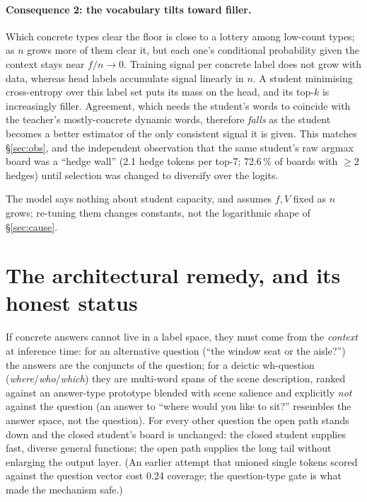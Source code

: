 \paragraph{Consequence 2: the vocabulary tilts toward filler.} Which concrete
types clear the floor is close to a lottery among low-count types; as $n$
grows more of them clear it, but each one's conditional probability given the
context stays near $f/n\to0$. Training signal per concrete label does not grow
with data, whereas head labels accumulate signal linearly in $n$. A student
minimising cross-entropy over this label set puts its mass on the head, and
its top-$k$ is increasingly filler. Agreement, which needs the student's words
to coincide with the teacher's mostly-concrete dynamic words, therefore
\emph{falls} as the student becomes a better estimator of the only consistent
signal it is given. This matches \S\ref{sec:obs}, and the independent
observation that the same student's raw argmax board was a ``hedge wall''
(2.1 hedge tokens per top-7; 72.6\,\% of boards with $\ge2$ hedges) until
selection was changed to diversify over the logits.

The model says nothing about student capacity, and assumes $f,V$ fixed as
$n$ grows; re-tuning them changes constants, not the logarithmic shape of
\S\ref{sec:cause}.

\section{The architectural remedy, and its honest status}
\label{sec:remedy}
If concrete answers cannot live in a label space, they must come from
the \emph{context} at inference time: for an alternative question (``the window seat or the
aisle?'') the answers are the conjuncts of the question; for a deictic
wh-question (\emph{where}/\emph{who}/\emph{which}) they are multi-word spans
of the scene description, ranked against an answer-type prototype blended with
scene salience and explicitly \emph{not} against the question (an answer to
``where would you like to sit?'' resembles the answer space, not the
question). For every other question the open path stands down and the closed
student's board is unchanged: the closed student supplies fast, diverse general
functions; the open path supplies the long tail without enlarging the output
layer. (An earlier attempt that unioned single tokens scored against the
question vector cost 0.24 coverage; the question-type gate is what made the
mechanism safe.)

